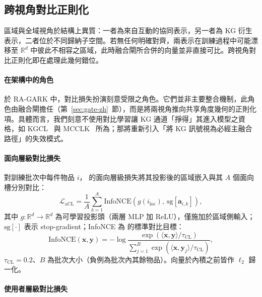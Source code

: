 \subsection{跨視角對比正則化}
\label{sec:cl-zh}

區域與全域視角於結構上異質：一者為來自互動的協同表示，另一者為 KG 衍生表示，二者位於不同歸納子空間。若無任何明確對齊，兩表示在訓練過程中可能漂移至 $\mathbb{R}^d$ 中彼此不相容之區域，此時融合閘所合併的向量並非直接可比。跨視角對比正則化即在處理此幾何錯位。

\paragraph{在架構中的角色}
\label{sec:cl-role-zh}

於 RA-GARK 中，對比損失扮演刻意受限之角色。它們並非主要整合機制，此角色由融合閘擔任（第~\ref{sec:gate-zh}~節），而是將兩視角推向共享角度幾何的正則化項。具體而言，我們刻意不使用對比學習讓 KG 通道「掙得」其進入模型之資格，如 KGCL~\cite{yang2022kgcl} 與 MCCLK~\cite{zou2022mcclk} 所為；那將重新引入「將 KG 訊號視為必經主融合路徑」的失效模式。

\paragraph{面向層級對比損失}
\label{sec:cl-acl-zh}

對訓練批次中每件物品 $i$， 的面向層級損失將其投影後的區域嵌入與其 $A$ 個面向槽分別對比：
\begin{equation}
\label{eq:lacl-zh}
\mathcal{L}_{\mathrm{aCL}} = \frac{1}{A} \sum_{k=1}^{A} \mathrm{InfoNCE}\!\left( g(i_{\mathrm{loc}}),\ \mathrm{sg}\!\left[\mathbf{a}_{i,k}\right] \right),
\end{equation}
其中 $g : \mathbb{R}^d \to \mathbb{R}^d$ 為可學習投影頭（兩層 MLP 加 ReLU），僅施加於區域側輸入；$\mathrm{sg}[\cdot]$ 表示 stop-gradient；InfoNCE 為  的標準對比目標：
\begin{equation}
\label{eq:infonce-zh}
\mathrm{InfoNCE}(\mathbf{x}, \mathbf{y}) = -\log \frac{\exp(\langle \mathbf{x}, \mathbf{y} \rangle / \tau_{\mathrm{CL}})}{\sum_{j=1}^{B} \exp(\langle \mathbf{x}, \mathbf{y}_j \rangle / \tau_{\mathrm{CL}})},
\end{equation}
$\tau_{\mathrm{CL}} = 0.2$、$B$ 為批次大小（負例為批次內其餘物品）。向量於內積之前皆作 $\ell_2$ 歸一化。

\paragraph{使用者層級對比損失}
\label{sec:cl-ucl-zh}

